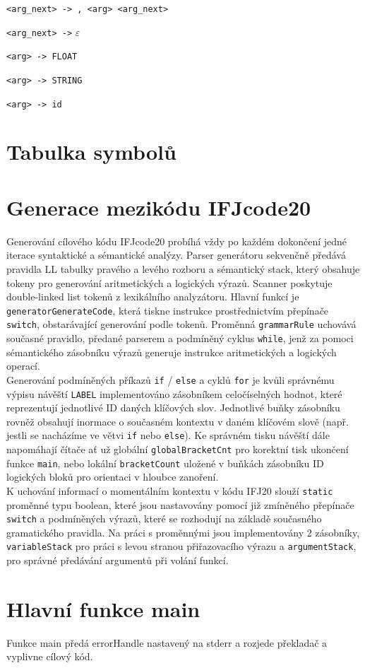 \documentclass[a4paper, 12pt]{article}
\begin{document}
\begin{enumerate}[noitemsep]
{            \item \verb|<arg_next> -> , <arg> <arg_next>|
            \item \verb|<arg_next> ->| $\varepsilon$
            \item \verb|<arg> -> FLOAT|
            \item \verb|<arg> -> STRING|
            \item \verb|<arg> -> id| 
            }
            
            
        \end{enumerate} 

\newpage

\section{Tabulka symbolů}

\section{Generace mezikódu IFJcode20}
Generování cílového kódu IFJcode20 probíhá vždy po každém dokončení jedné iterace syntaktické a sémantické analýzy. Parser generátoru sekvenčně předává pravidla LL tabulky pravého a levého rozboru a sémantický stack, který obsahuje tokeny pro generování aritmetických a logických výrazů. Scanner poskytuje double-linked list tokenů z lexikálního analyzátoru.
\newline
\newline
Hlavní funkcí je \verb|generatorGenerateCode|, která tiskne instrukce prostřednictvím přepínače \verb|switch|, obstarávající generování podle tokenů. Proměnná \verb|grammarRule| uchovává současné pravidlo, předané parserem a podmíněný cyklus \verb|while|, jenž za pomoci sémantického zásobníku výrazů generuje instrukce aritmetických a logických operací.\\
\newline
Generování podmíněných příkazů \verb|if| / \verb|else| a cyklů \verb|for| je kvůli správnému výpisu návěští \verb|LABEL| implementováno  zásobníkem celočíselných hodnot, které reprezentují jednotlivé ID daných klíčových slov. Jednotlivé buňky zásobníku rovněž obsahují inormace o současném kontextu v daném klíčovém slově (např. jestli se nacházíme ve větvi \verb|if| nebo \verb|else|). Ke správném tisku návěští dále napomáhají čítače ať už globální \verb|globalBracketCnt| pro korektní tisk ukončení funkce \verb|main|, nebo lokální \verb|bracketCount| uložené v buňkách zásobníku ID logických bloků pro orientaci v hloubce zanoření.\\
\newline
K uchování informací o momentálním kontextu v kódu IFJ20 slouží \verb|static| proměnné typu boolean, které jsou nastavovány pomocí již zmíněného přepínače \verb|switch| a podmíněných výrazů, které se rozhodují na základě současného gramatického pravidla. Na práci s proměnnými jsou implementovány 2 zásobníky, \verb|variableStack| pro práci s levou stranou přiřazovacího výrazu a \verb|argumentStack|, pro správné předávání argumentů při volání funkcí.

\section{Hlavní funkce main}
Funkce main předá errorHandle nastavený na stderr a rozjede překladač a vyplivne cílový kód. 
\end{document}
